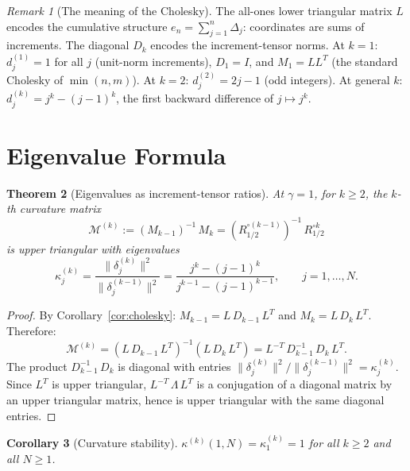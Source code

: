 \documentclass[11pt,a4paper]{article}
\theoremstyle{plain}
\newtheorem{theorem}{Theorem}[section]
\newtheorem{corollary}[theorem]{Corollary}
\theoremstyle{definition}
\theoremstyle{remark}
\newtheorem{remark}[theorem]{Remark}
\begin{document}
\begin{remark}[The meaning of the Cholesky]
\label{rem:cholesky-meaning}
The all-ones lower triangular matrix $L$ encodes the
cumulative structure $e_n = \sum_{j=1}^n \Delta_j$:
coordinates are sums of increments.  The diagonal
$D_k$ encodes the increment-tensor norms.  At $k = 1$:
$d_j^{(1)} = 1$ for all $j$ (unit-norm increments),
$D_1 = I$, and $M_1 = LL^T$ (the standard Cholesky
of $\min(n,m)$).  At $k = 2$:
$d_j^{(2)} = 2j-1$ (odd integers).
At general $k$: $d_j^{(k)} = j^k - (j{-}1)^k$,
the first backward difference of $j \mapsto j^k$.
\end{remark}


\section{Eigenvalue Formula}\label{sec:eigenvalues}

\begin{theorem}[Eigenvalues as increment-tensor ratios]
\label{thm:eigenvalues}
At $\gamma = 1$, for $k \geq 2$, the $k$-th curvature
matrix
\[
  \mathcal{M}^{(k)}
  := (M_{k-1})^{-1}\,M_k
  = (R_{1/2}^{\circ(k-1)})^{-1}\,R_{1/2}^{\circ k}
\]
is upper triangular with eigenvalues
\begin{equation}\label{eq:eigenvalue-formula}
  \kappa_j^{(k)}
  = \frac{\|\delta_j^{(k)}\|^2}{\|\delta_j^{(k-1)}\|^2}
  = \frac{j^k - (j-1)^k}{j^{k-1} - (j-1)^{k-1}},
  \qquad j = 1,\ldots,N.
\end{equation}
\end{theorem}

\begin{proof}
By Corollary~\ref{cor:cholesky}:
$M_{k-1} = L\,D_{k-1}\,L^T$ and $M_k = L\,D_k\,L^T$.
Therefore:
\[
  \mathcal{M}^{(k)}
  = (L\,D_{k-1}\,L^T)^{-1}(L\,D_k\,L^T)
  = L^{-T}\,D_{k-1}^{-1}\,D_k\,L^T.
\]
The product $D_{k-1}^{-1}\,D_k$ is diagonal with entries
$\|\delta_j^{(k)}\|^2 / \|\delta_j^{(k-1)}\|^2
= \kappa_j^{(k)}$.
Since $L^T$ is upper triangular,
$L^{-T}\,\Lambda\,L^T$ is a conjugation of a diagonal
matrix by an upper triangular matrix, hence is upper
triangular with the same diagonal entries.
\end{proof}

\begin{corollary}[Curvature stability]
\label{cor:stability}
$\kappa^{(k)}(1,N) = \kappa_1^{(k)} = 1$ for all
$k \geq 2$ and all $N \geq 1$.
\end{corollary}
\end{document}
